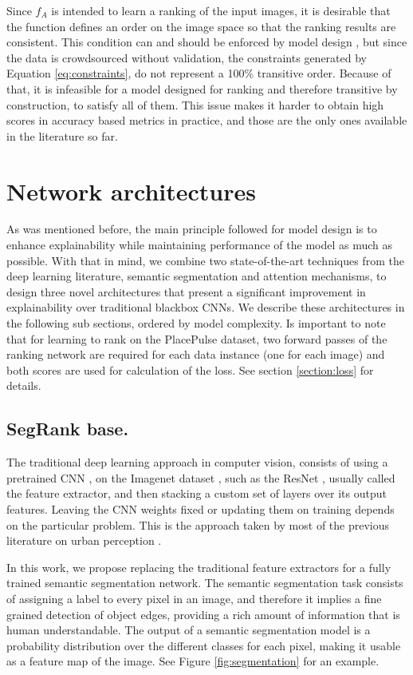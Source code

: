 Since $f_A$ is intended to learn a ranking of the input images, it is desirable that the function defines an order
on the image space so that the ranking results are consistent. This condition can and should be enforced by
model design \cite{koppel_pairwise}, but since the data is crowdsourced without
validation, the constraints generated by Equation \ref{eq:constraints}, do not represent a  100\% transitive order.
Because of that, it is infeasible for a model designed for ranking and therefore
transitive by construction, to satisfy all of them.
This issue makes it harder to obtain high scores in accuracy based metrics in practice, and
those are the only ones available in the literature so far.


\section{Network architectures}
\label{sec:nn_arch}
As was mentioned before, the main principle followed for model design is to enhance explainability
while maintaining performance of the model as much as possible. With that in mind, we combine two
state-of-the-art techniques from the deep learning literature, semantic segmentation
and attention mechanisms, to design three novel architectures that present a significant
improvement in explainability over traditional blackbox CNNs. We describe these architectures
in the following sub sections, ordered by model complexity. Is important to note that
for learning to rank on the PlacePulse dataset,
two forward passes of the ranking  network are required for each data instance (one for each image) and both scores are used
for calculation of the loss. See section \ref{section:loss} for  details.


\subsection{SegRank base.}
The traditional deep learning approach in computer vision, consists of using a pretrained
CNN \cite{lecun_mnist}, on the Imagenet dataset \cite{imagenet}, such as the ResNet \cite{he_resnet},
usually called the feature extractor, and then stacking a custom set of layers over its output features. Leaving the CNN weights
fixed or updating them on training  depends on the particular problem. This is the approach taken
by most of the previous literature on urban perception \cite{hidalgo_placepulse,tamara_judgments,zhang_measuring}.

In this work, we propose replacing the traditional feature extractors for a fully trained semantic segmentation
network. The semantic segmentation task consists of assigning a label to every pixel in an image, and therefore
it implies a fine grained detection of object edges, providing a rich amount of information that is human understandable.
The output of a semantic segmentation model is a probability distribution over the different classes for each pixel,
making it usable as a feature map of the image. See Figure \ref{fig:segmentation} for an example.

